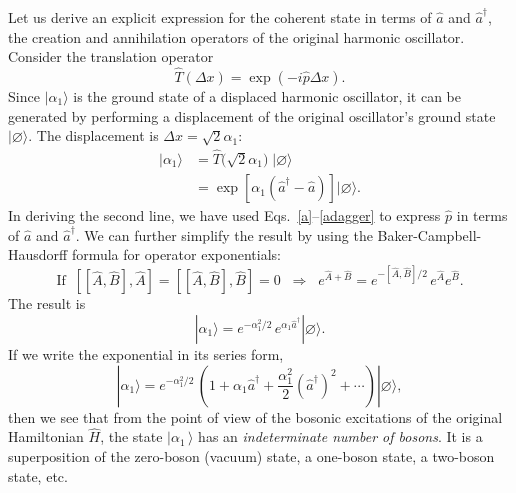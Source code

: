 \documentclass[pra,12pt]{revtex4}
\begin{document}
Let us derive an explicit expression for the coherent state in terms
of $\hat{a}$ and $\hat{a}^\dagger$, the creation and annihilation
operators of the original harmonic oscillator.  Consider the
translation operator
\begin{equation}
  \hat{T}(\Delta x) = \exp(-i\hat{p}\Delta x).
\end{equation}
Since $|\alpha_1\rangle$ is the ground state of a displaced harmonic
oscillator, it can be generated by performing a displacement of the
original oscillator's ground state $|\varnothing\rangle$.  The
displacement is $\Delta x = \sqrt{2}\alpha_1$:
\begin{align}
  |\alpha_1\rangle &= \hat{T}\big(\sqrt{2}\alpha_1\big)\; |\varnothing\rangle  \\
  &= \exp\left[\alpha_1\left(\hat{a}^\dagger - \hat{a}\right)\right] |\varnothing\rangle.
\end{align}
In deriving the second line, we have used
Eqs.~\eqref{a}--\eqref{adagger} to express $\hat{p}$ in terms of
$\hat{a}$ and $\hat{a}^\dagger$.  We can further simplify the result
by using the Baker-Campbell-Hausdorff formula for operator
exponentials:
\begin{equation}
  \mathrm{If} \;\; [[\hat{A},\hat{B}],\hat{A}] = [[\hat{A},\hat{B}],\hat{B}] = 0
  \;\;\Rightarrow \;\; e^{\hat{A}+\hat{B}}
  = e^{-[\hat{A},\hat{B}]/2}\, e^{\hat{A}} e^{\hat{B}}.
\end{equation}
The result is
\begin{equation}
  |\alpha_1\rangle = e^{-\alpha_1^2/2} \, e^{\alpha_1 \hat{a}^\dagger} |\varnothing\rangle.
\end{equation}
If we write the exponential in its series form,
\begin{equation}
  |\alpha_1\rangle = e^{-\alpha_1^2/2} \, \left(1 + \alpha_1 \hat{a}^\dagger
  + \frac{\alpha_1^2}{2} \left(\hat{a}^\dagger\right)^2 + \cdots\right)
 |\varnothing\rangle,
\end{equation}
then we see that from the point of view of the bosonic excitations of
the original Hamiltonian $\hat{H}$, the state $|\alpha_1\,\rangle$ has
an \textit{indeterminate number of bosons}.  It is a superposition of
the zero-boson (vacuum) state, a one-boson state, a two-boson state,
etc.
\end{document}
